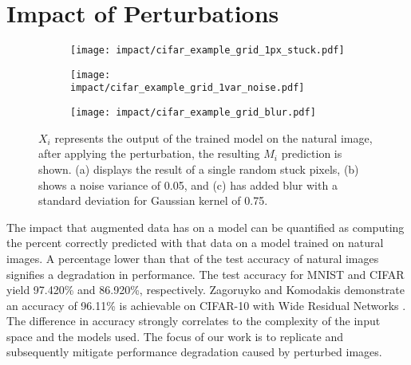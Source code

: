 \documentclass[conference]{IEEEtran}
\begin{document}
\section{Impact of Perturbations}
\label{sec:impact_of_perturb}

\begin{figure*}[!t]
    \centering
    \begin{subfigure}{0.307\linewidth}
        \centering
        \texttt{[image: impact/cifar\_example\_grid\_1px\_stuck.pdf]}
        \caption{}
        \label{fig:impact_visual_blur}
    \end{subfigure}
    \hspace{0.7em}
    \begin{subfigure}{0.335\linewidth}
        \centering
        \texttt{[image: impact/cifar\_example\_grid\_1var\_noise.pdf]}
        \caption{}
        \label{fig:impact_visual_noise}
    \end{subfigure}
    \hspace{0.7em}
    \begin{subfigure}{0.307\linewidth}
        \centering
        \texttt{[image: impact/cifar\_example\_grid\_blur.pdf]}
        \caption{}
        \label{fig:impact_visual_pixel}
    \end{subfigure}
    \captionsetup{width=1\linewidth}
    \caption{$X_i$ represents the output of the trained model on the natural image, after applying the perturbation, the resulting $M_i$ prediction is shown. (a) displays the result of a single random stuck pixels, (b) shows a noise variance of 0.05, and (c) has added blur with a standard deviation for Gaussian kernel of 0.75.}
    \label{fig:impact_visual_all}
\end{figure*}

The impact that augmented data has on a model can be quantified as computing the percent correctly predicted with that data on a model trained on natural images. A percentage lower than that of the test accuracy of natural images signifies a degradation in performance. The test accuracy for MNIST and CIFAR yield 97.420\% and 86.920\%, respectively. Zagoruyko and Komodakis demonstrate an accuracy of 96.11\% is achievable on CIFAR-10 with Wide Residual Networks \cite{Zagoruyko2016wideresnet}. The difference in accuracy strongly correlates to the complexity of the input space and the models used. The focus of our work is to replicate and subsequently mitigate performance degradation caused by perturbed images.
\end{document}
